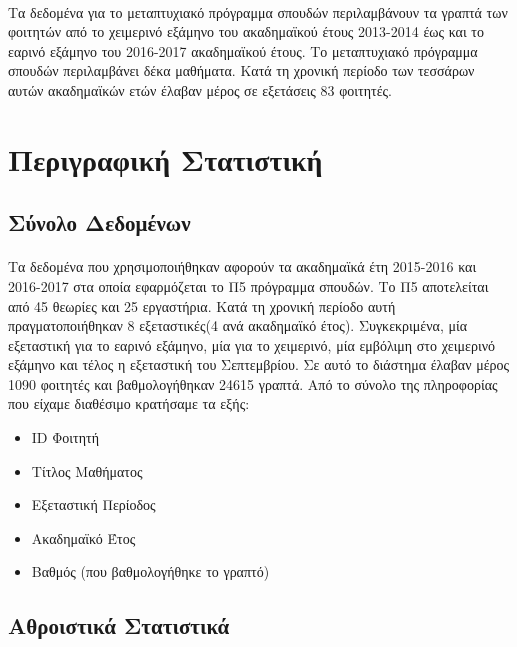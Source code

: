 \documentclass[12pt,a4paper,final]{article}
\begin{document}
\paragraph{}
Τα δεδομένα για το μεταπτυχιακό πρόγραμμα σπουδών περιλαμβάνουν τα γραπτά των φοιτητών από το χειμερινό εξάμηνο του ακαδημαϊκού έτους 2013-2014 έως και το εαρινό εξάμηνο του 2016-2017 ακαδημαϊκού έτους. Το μεταπτυχιακό πρόγραμμα σπουδών περιλαμβάνει δέκα μαθήματα. Κατά τη χρονική περίοδο των τεσσάρων αυτών ακαδημαϊκών ετών έλαβαν μέρος σε εξετάσεις 83 φοιτητές.  


\section{Περιγραφική Στατιστική}
\subsection{Σύνολο Δεδομένων}
\paragraph{}
Τα δεδομένα που χρησιμοποιήθηκαν αφορούν τα ακαδημαϊκά έτη 2015-2016 και 2016-2017 στα οποία εφαρμόζεται το Π5 πρόγραμμα σπουδών. Το Π5 αποτελείται από 45 θεωρίες και 25 εργαστήρια. Κατά τη χρονική περίοδο αυτή πραγματοποιήθηκαν 8 εξεταστικές(4 ανά ακαδημαϊκό έτος). Συγκεκριμένα, μία εξεταστική για το εαρινό εξάμηνο, μία για το χειμερινό, μία εμβόλιμη στο χειμερινό εξάμηνο και τέλος η εξεταστική του Σεπτεμβρίου. Σε αυτό το διάστημα έλαβαν μέρος 1090 φοιτητές και βαθμολογήθηκαν 24615 γραπτά. Από το σύνολο της πληροφορίας που είχαμε διαθέσιμο κρατήσαμε τα εξής:
\begin{itemize}
\item \foreignlanguage{english}{ID} Φοιτητή
\item Τίτλος Μαθήματος
\item Εξεταστική Περίοδος 
\item Ακαδημαϊκό Έτος
\item Βαθμός (που βαθμολογήθηκε το γραπτό)
\end{itemize}

\subsection{Αθροιστικά Στατιστικά}
\end{document}
